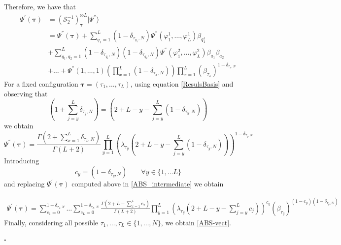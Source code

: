 \documentclass[10pt]{article}
\numberwithin{equation}{section}
\numberwithin{equation}{subsection}
\begin{document}
Therefore, we have that 
\begin{equation}\label{ABS_intermediate}
	\begin{split}
		\Psi^{'}(\bm{\tau})&=(\mathcal{S}_{2}^{-1})_{\bm{\tau}}^{\otimes L}|\Psi^{''}\rangle\\&= \Psi^{''}(\bm{\tau})+\sum_{q_{1}= 1}^{L}(1-\delta_{\tau_{q_{1}},N})\Psi^{''}(\varphi_{1}^{1},\ldots,\varphi_{L}^{1})\beta_{q_{1}^{1}}\\&+
		\sum_{q_{1},q_{2}= 1}^{L}(1-\delta_{\tau_{q_{1}},N})(1-\delta_{\tau_{q_{2}},N})\Psi^{''}(\varphi_{1}^{2},\ldots,\varphi_{L}^{2})\beta_{a_{1}}\beta_{a_{2}}\\&+\ldots+\Psi^{''}(1,\ldots,1)\left(\prod_{x=1}^{L}(1-\delta_{\tau_{x},N})\right)\prod_{x=1}^{L}\left(\beta_{\tau_{x}}\right)^{1-\delta_{\tau_{x},N}}
	\end{split}
\end{equation}
For a fixed configuration $\bm{\tau}=(\tau_{1},\ldots,\tau_{L})$, using equation \eqref{ResulsBasis} and observing that 
\begin{equation}
  \left(1+\sum_{j=y}^{L}\delta_{\tau_{j},N}\right) =\left(2+L-y-\sum_{j=y}^{L}(1-\delta_{\tau_{y},N})\right)
\end{equation}
we obtain 
    \begin{equation}
\Psi^{''}(\bm{\tau})=\frac{\Gamma(2+\sum_{x=1}^{L}\delta_{\tau_{x},N})}{\Gamma(L+2)}\prod_{y=1}^{L}\left(\lambda_{\tau_{y}}\left(2+L-y-\sum_{j=y}^{L}(1-\delta_{\tau_{y},N})\right)\right)^{1-\delta_{\tau_{y},N}}
\end{equation}
Introducing
\begin{equation}
	c_{y}=(1-\delta_{\tau_{y},N}) \qquad \forall y\in \{1,\ldots L\}
\end{equation}
and replacing $\Psi^{'}(\bm{\tau})$ computed above in \eqref{ABS_intermediate} we obtain 


\begin{equation}\label{elementsABS}
	\begin{split}
		\Psi^{'}(\bm{\tau})=\sum_{c_{1}=0}^{1-\delta_{\tau_{1},N}}\ldots\sum_{c_{L}=0}^{1-\delta_{\tau_{L},N}}\frac{\Gamma(2+L-\sum_{x=1}^{L}c_{x})}{\Gamma(L+2)}\prod_{y=1}^{L}\left(\lambda_{\tau_{y}}\left(2+L-y-\sum_{j=y}^{L}c_{j}\right)\right)^{c_{y}}\left(\beta_{\tau_{y}}\right)^{(1-c_{y})(1-\delta_{\tau_{y},N})}
	\end{split}
\end{equation} 
Finally, considering all possible $\tau_{1},\ldots,\tau_{L}\in \{1,\ldots,N\}$, we obtain \eqref{ABS-vect}.
\begin{flushright}
    $\square$
\end{flushright}
\end{document}
